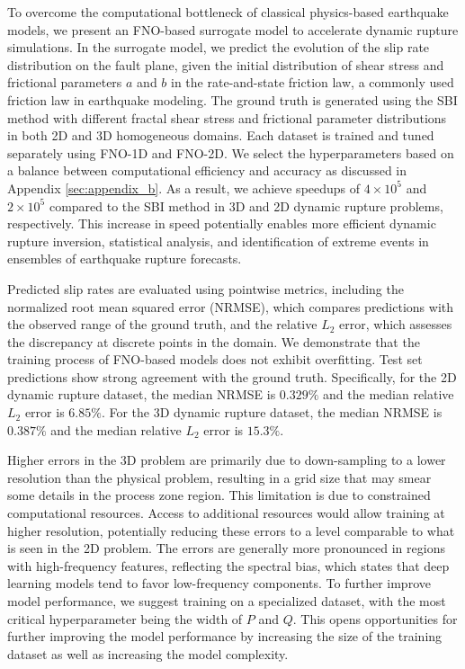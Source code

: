 \documentclass[draft]{agujournal2019}
\begin{document}
To overcome the computational bottleneck of classical physics-based earthquake models, we present an FNO-based surrogate model to accelerate dynamic rupture simulations. In the surrogate model, we predict the evolution of the slip rate distribution on the fault plane, given the initial distribution of shear stress and frictional parameters \(a\) and \(b\) in the rate-and-state friction law, a commonly used friction law in earthquake modeling. The ground truth is generated using the SBI method with different fractal shear stress and frictional parameter distributions in both 2D and 3D homogeneous domains. Each dataset is trained and tuned separately using FNO-1D and FNO-2D. We select the hyperparameters based on a balance between computational efficiency and accuracy as discussed in Appendix \ref{sec:appendix_b}. As a result, we achieve speedups of \( 4 \times 10^5 \) and \( 2 \times 10^5 \) compared to the SBI method in 3D and 2D dynamic rupture problems, respectively. This increase in speed potentially enables more efficient dynamic rupture inversion, statistical analysis, and identification of extreme events in ensembles of earthquake rupture forecasts.

Predicted slip rates are evaluated using pointwise metrics, including the normalized root mean squared error (NRMSE), which compares predictions with the observed range of the ground truth, and the relative \(L_2\) error, which assesses the discrepancy at discrete points in the domain. We demonstrate that the training process of FNO-based models does not exhibit overfitting. Test set predictions show strong agreement with the ground truth. Specifically, for the 2D dynamic rupture dataset, the median NRMSE is \(0.329\%\) and the median relative \(L_2\) error is \(6.85\%\). For the 3D dynamic rupture dataset, the median NRMSE is \(0.387\%\) and the median relative \(L_2\) error is \(15.3\%\). 

Higher errors in the 3D problem are primarily due to down-sampling to a lower resolution than the physical problem, resulting in a grid size that may smear some details in the process zone region. This limitation is due to constrained computational resources. Access to additional resources would allow training at higher resolution, potentially reducing these errors to a level comparable to what is seen in the 2D problem. The errors are generally more pronounced in regions with high-frequency features, reflecting the spectral bias, which states that deep learning models tend to favor low-frequency components. To further improve model performance, we suggest training on a specialized dataset, with the most critical hyperparameter being the width of \(P\) and \(Q\). This opens opportunities for further improving the model performance by increasing the size of the training dataset as well as increasing the model complexity.  
\end{document}

